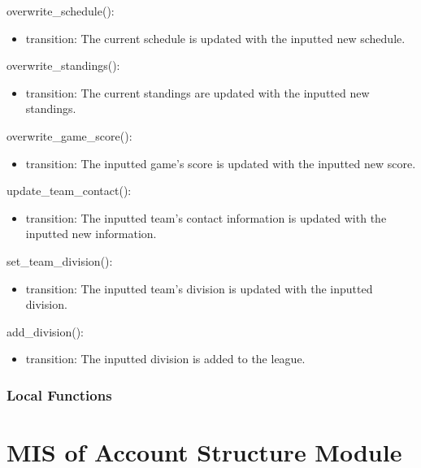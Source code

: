 \documentclass[12pt, titlepage]{article}
\begin{document}
\noindent overwrite\_schedule():
\begin{itemize}
\item transition: The current schedule is updated with the inputted new
      schedule.
\end{itemize}

\noindent overwrite\_standings():
\begin{itemize}
\item transition: The current standings are updated with the inputted new
      standings.
\end{itemize}

\noindent overwrite\_game\_score():
\begin{itemize}
\item transition: The inputted game's score is updated with the inputted new
      score.
\end{itemize}

\noindent update\_team\_contact():
\begin{itemize}
\item transition: The inputted team's contact information is updated with the
      inputted new information.
\end{itemize}

\noindent set\_team\_division():
\begin{itemize}
\item transition: The inputted team's division is updated with the inputted
      division.
\end{itemize}

\noindent add\_division():
\begin{itemize}
\item transition: The inputted division is added to the league.
\end{itemize}

\subsubsection{Local Functions}

 

\newpage

\section{MIS of Account Structure Module} \label{mAS}
\end{document}
